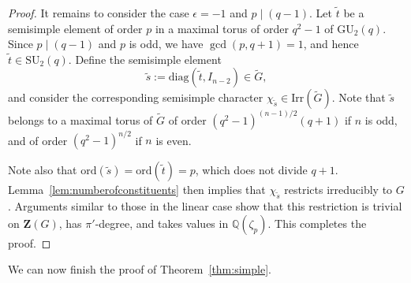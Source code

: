\documentclass[12pt]{amsart}
\theoremstyle{definition}
\numberwithin{equation}{section}
\newcommand{\GU}{{\mathrm {GU}}}
\newcommand{\SU}{{\mathrm {SU}}}
\newcommand{\Irr}{{\mathrm {Irr}}}
\newcommand{\ord}{{\mathrm {ord}}}
\newcommand{\diag}{{\mathrm {diag}}}
\newcommand{\QQ}{{\mathbb Q}}
\newcommand{\bZ}{{\mathbf{Z}}}
\begin{document}
\begin{proof}
It remains to consider the case $\epsilon=-1$ %
and $p \mid (q-1)$.
Let \(\widetilde{t}\) be a semisimple element of order \(p\) in a
maximal torus of order $q^2-1$ of \(\GU_2(q)\). Since \(p \mid
(q-1)\) and \(p\) is odd, we have \(\gcd(p,q+1)=1\), and hence
\(\widetilde{t}\in \SU_2(q)\). Define the semisimple element
\[
\widetilde{s}:=\diag\left(\widetilde{t}, I_{n-2}\right)\in
\widetilde{G},
\]
and consider the corresponding semisimple character
\(\chi_{\widetilde{s}}\in \Irr(\widetilde{G})\). Note that
$\widetilde{s}$ belongs to a maximal torus of $\widetilde{G}$ of
order $(q^2-1)^{(n-1)/2}(q+1)$ if $n$ is odd, and of %
order
$(q^2-1)^{n/2}$ if $n$ is %
even.

Note also that \(\ord(\widetilde{s})=\ord(\widetilde{t})=p\), which
does not divide $q+1$. Lemma~\ref{lem:numberofconstituents} then
implies that \(\chi_{\widetilde{s}}\) restricts irreducibly to
\(G\). Arguments similar to those in the linear case show that this
restriction is trivial on \(\bZ(G)\), has \(\pi'\)-degree, and takes
values in \(\QQ(\zeta_p)\). This completes the proof.
\end{proof}


We can now finish the proof of Theorem~\ref{thm:simple}.
\end{document}
